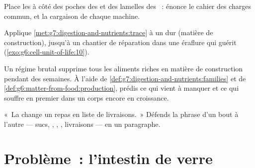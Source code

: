 \begin{exercise}[$\star\star$]\label{exo:g7:digestion-and-nutrients:9}
Place les  à côté des poches des  et des lamelles
des ~: énonce le cahier des charges commun, et la
cargaison de chaque machine.
\end{exercise}

\begin{exercise}[$\star\star$]\label{exo:g7:digestion-and-nutrients:10}
Applique \cref{met:g7:digestion-and-nutrients:trace} à un  dur
(matière de construction), jusqu'à un chantier de réparation dans
une éraflure qui guérit (\cref{exo:g6:cell-unit-of-life:10}).
\end{exercise}

\begin{exercise}[$\star\star$]\label{exo:g7:digestion-and-nutrients:11}
Un régime brutal supprime tous les aliments riches en matière de
construction pendant des semaines. À l'aide de
\cref{def:g7:digestion-and-nutrients:families} et de
\cref{def:g6:matter-from-food:production}, prédis ce qui vient à
manquer et ce qui souffre en premier dans un corps encore en
croissance.
\end{exercise}

\begin{exercise}[$\star\star\star$]\label{exo:g7:digestion-and-nutrients:12}
«~La  change un repas en liste de livraisons.~» Défends la
phrase d'un bout à l'autre --- sucs, , , ,
livraisons --- en un paragraphe.
\end{exercise}

\section{Problème~: l'intestin de verre}

